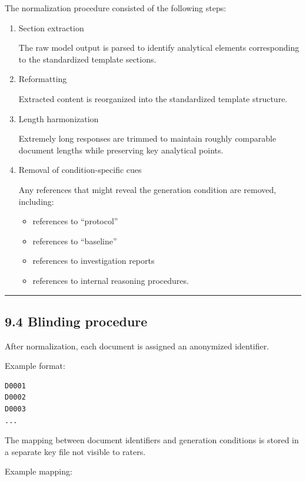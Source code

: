 {The normalization procedure consisted of the following steps:

\begin{enumerate}
\item Section extraction

The raw model output is parsed to identify analytical elements corresponding to the standardized template sections.

\item Reformatting

Extracted content is reorganized into the standardized template structure.

\item Length harmonization

Extremely long responses are trimmed to maintain roughly comparable document lengths while preserving key analytical points.

\item Removal of condition-specific cues

Any references that might reveal the generation condition are removed, including:

\begin{itemize}
\item references to “protocol”
\item references to “baseline”
\item references to investigation reports
\item references to internal reasoning procedures.
\end{itemize}

\end{enumerate}

\noindent\rule{\textwidth}{0.4pt}

\subsection*{9.4 Blinding procedure}

After normalization, each document is assigned an anonymized identifier.

Example format:

\begin{verbatim}
D0001
D0002
D0003
...
\end{verbatim}

The mapping between document identifiers and generation conditions is stored in a separate key file not visible to raters.

Example mapping:

}

